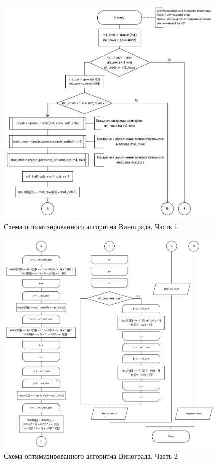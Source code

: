\begin{figure}[H]
\centering
\includegraphics[width=\textwidth]{inc/img/winograd_opt_1.pdf}
\caption{Схема оптимизированного алгоритма Винограда. Часть 1}
\label{fig:winograd_opt_scheme_1}
\end{figure}

\begin{figure}[H]
\centering
\includegraphics[width=\textwidth]{inc/img/winograd_opt_2.pdf}
\caption{Схема оптимизированного алгоритма Винограда. Часть 2}
\label{fig:winograd_opt_scheme_2}
\end{figure}

